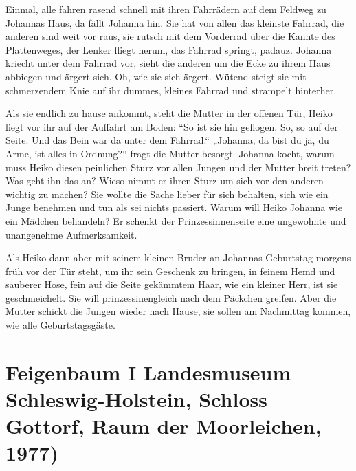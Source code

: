 \documentclass[10pt,a5paper]{book}
\begin{document}
Einmal, alle fahren rasend schnell mit ihren Fahrrädern auf dem Feldweg zu Johannas Haus, da fällt Johanna hin. Sie hat von allen das kleinste Fahrrad, die anderen sind weit vor raus, sie rutsch mit dem Vorderrad über die Kannte des Plattenweges, der Lenker fliegt herum, das Fahrrad springt, padauz. Johanna kriecht unter dem Fahrrad vor, sieht die anderen um die Ecke zu ihrem Haus abbiegen und ärgert sich. Oh, wie sie sich ärgert. Wütend steigt sie mit schmerzendem Knie auf ihr dummes, kleines Fahrrad und strampelt hinterher.

Als sie endlich zu hause ankommt, steht die Mutter in der offenen Tür, Heiko liegt vor ihr auf der Auffahrt am Boden: “So ist sie hin geflogen. So, so auf der Seite. Und das Bein war da unter dem Fahrrad.“ „Johanna, da bist du ja, du Arme, ist alles in Ordnung?“ fragt die Mutter besorgt.
 Johanna kocht, warum muss Heiko diesen peinlichen Sturz vor allen Jungen und der Mutter breit treten? Was geht ihn das an? Wieso nimmt er ihren Sturz um sich vor den anderen wichtig zu machen? Sie wollte die Sache lieber für sich behalten, sich wie ein Junge benehmen und tun als sei nichts passiert. Warum will Heiko Johanna wie ein Mädchen behandeln? Er schenkt der Prinzessinnenseite eine ungewohnte und unangenehme Aufmerksamkeit.
 
Als Heiko dann aber mit seinem kleinen Bruder an Johannas Geburtstag morgens früh vor der Tür steht, um ihr sein Geschenk zu bringen, in feinem Hemd und sauberer Hose, fein auf die Seite gekämmtem Haar, wie ein kleiner Herr, ist sie geschmeichelt. Sie will prinzessinengleich nach dem Päckchen greifen.  Aber die Mutter schickt die Jungen wieder nach Hause, sie sollen am Nachmittag kommen, wie alle Geburtstagsgäste.



\section*{Feigenbaum I 
Landesmuseum Schleswig-Holstein, Schloss Gottorf, Raum der Moorleichen, 1977)}
\end{document}
